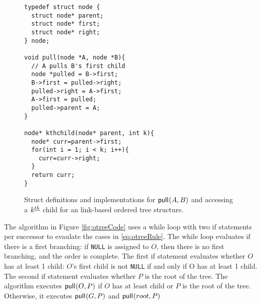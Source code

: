 \begin{figure}[H]
	\begin{center}

	    \begin{Verbatim}
typedef struct node {
  struct node* parent;
  struct node* first;
  struct node* right;
} node;

void pull(node *A, node *B){ 
  // A pulls B's first child
  node *pulled = B->first;
  B->first = pulled->right;
  pulled->right = A->first;
  A->first = pulled;
  pulled->parent = A;
}

node* kthchild(node* parent, int k){
  node* curr=parent->first;
  for(int i = 1; i < k; i++){
    curr=curr->right;
  }
  return curr;
}
\end{Verbatim}

    \cprotect\caption{Struct definitions and implementations for $\mathsf{pull}_{}(A,B)$ and accessing a $k^{\underline{th}}$ child for an link-based ordered tree structure.}
\label{fig:otreestarter-link}
	\end{center}
\end{figure}

    The algorithm in Figure \ref{fig:otreeCode} uses a while loop with two if statements per successor to evaulate the cases in \eqref{eq:otreeRule}.  The while loop evaluates if there is a first branching: if \verb+NULL+ is assigned to $O$, then there is no first branching, and the order is complete.  The first if statement evaluates whether $O$ has at least 1 child: $O$'s first child is not \verb+NULL+ if and only if O has at least 1 child. The second if statement evaluates whether $P$ is the root of the tree.  The algorithm executes $\mathsf{pull}_{}(O,P)$ if $O$ has at least child or $P$ is the root of the tree.  Otherwise, it executes $\mathsf{pull}_{}(G,P)$ and $\mathsf{pull}_{}(root,P)$ 


